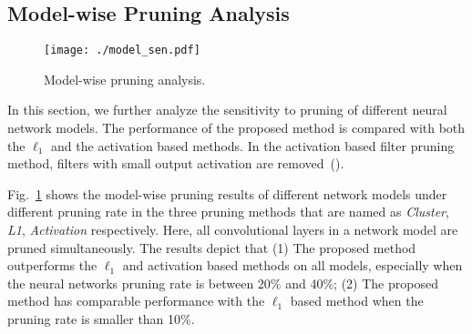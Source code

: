 \documentclass{article} %
\begin{document}
\subsection{Model-wise Pruning Analysis}\begin{figure}[b]
  \centering
  \texttt{[image: ./model\_sen.pdf]}
  \caption{Model-wise pruning analysis.}
  \label{fig:model}
  \vspace{-2mm}
\end{figure}

In this section, we further analyze the sensitivity to pruning of different neural network models.
The performance of the proposed method is compared with both the $\ell_1$ and the activation based methods.
In the activation based filter pruning method, filters with small output activation are removed~(\cite{polyak2015channel}).

Fig.~\ref{fig:model} shows the model-wise pruning results of different network models under different pruning rate in the three pruning methods that are named as \emph{Cluster}, \emph{L1}, \emph{Activation} respectively.
Here, all convolutional layers in a network model are pruned simultaneously.
The results depict that
(1) The proposed method outperforms the $\ell_1$ and activation based methods on all models, especially when the neural networks pruning rate is between 20\% and 40\%;
(2) The proposed method has comparable performance with the $\ell_1$ based method when the pruning rate is smaller than 10\%.
\end{document}
